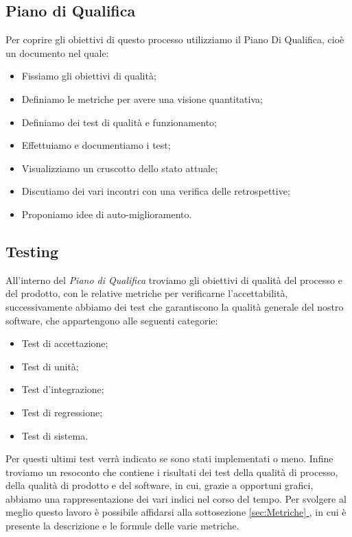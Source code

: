   \subsection{Piano di Qualifica}
  Per coprire gli obiettivi di questo processo utilizziamo il Piano Di
  Qualifica, cioè un documento nel quale:
  \begin{itemize}
      \item Fissiamo gli obiettivi di qualità;
      \item Definiamo le metriche per avere una visione quantitativa;
      \item Definiamo dei test di qualità e funzionamento;
      \item Effettuiamo e documentiamo i test;
      \item Visualizziamo un cruscotto dello stato attuale;
      \item Discutiamo dei vari incontri con una verifica delle retrospettive;
      \item Proponiamo idee di auto-miglioramento.
  \end{itemize}

  \subsection{Testing}
  All'interno del \textit{Piano di Qualifica} troviamo gli obiettivi di qualità del processo e del prodotto, con le relative metriche per verificarne l'accettabilità, successivamente abbiamo dei test che garantiscono la qualità generale del nostro software, che appartengono alle seguenti categorie:
  \begin{itemize}
      \item Test di accettazione;
      \item Test di unità;
      \item Test d'integrazione;
      \item Test di regressione;
      \item Test di sistema.
  \end{itemize}
  Per questi ultimi test verrà indicato se sono stati implementati o meno.
  \newline
  Infine troviamo un resoconto che contiene i risultati dei test della qualità di processo, della qualità di prodotto e del software, in cui, grazie a opportuni grafici, abbiamo una rappresentazione dei vari indici nel corso del tempo. Per svolgere al meglio questo lavoro è possibile affidarsi alla sottosezione \underline{\ref{sec:Metriche} }, in cui è presente la descrizione e le formule delle varie metriche.


